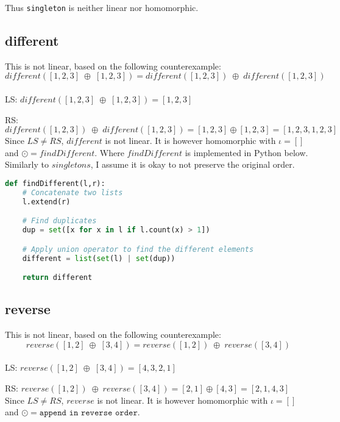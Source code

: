 Thus \texttt{singleton} is neither linear nor homomorphic.

\newpage
\subsection*{different}
This is not linear, based on the following counterexample:
$$
  different( [1,2,3] \; \oplus \; [1,2,3]) = different( [1,2,3]) \; \oplus \; different( [1,2,3] )
$$
\\
LS: \tab
$
 different( [1,2,3] \; \oplus \; [1,2,3]) = [1,2,3]
$

RS: \tab
$
different( [1,2,3]) \; \oplus \; different( [1,2,3] ) = [1,2,3] \oplus [1,2,3] = [1,2,3,1,2,3]
$
\\

Since $LS \neq RS$, $different$ is not linear. It is however homomorphic with $\iota = []$ and $\odot = findDifferent$. Where $findDifferent$ is implemented in Python below. Similarly to $singletons$, I assume it is okay to not preserve the original order.
\begin{lstlisting}[language = Python]
def findDifferent(l,r):
    # Concatenate two lists
    l.extend(r)

    # Find duplicates
    dup = set([x for x in l if l.count(x) > 1])

    # Apply union operator to find the different elements
    different = list(set(l) | set(dup))

    return different
\end{lstlisting}

\subsection*{reverse}
This is not linear, based on the following counterexample:
$$
  reverse( [1,2] \; \oplus \; [3,4]) = reverse( [1,2]) \; \oplus \; reverse( [3,4] )
$$
\\
LS: \tab
$
reverse( [1,2] \; \oplus \; [3,4]) = [4,3,2,1]
$

RS: \tab
$
reverse( [1,2]) \; \oplus \; reverse( [3,4] ) = [2,1] \oplus [4,3] = [2,1,4,3]
$
\\

Since $LS \neq RS$, $reverse$ is not linear. It is however homomorphic with $\iota = []$ and $\odot = \texttt{append in reverse order}$.